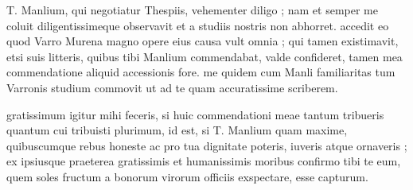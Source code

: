


 T. Manlium, qui negotiatur Thespiis, vehementer diligo ; nam et semper me coluit diligentissimeque observavit et a studiis nostris non abhorret. accedit eo quod Varro Murena magno opere eius causa vult omnia ; qui tamen existimavit, etsi suis litteris, quibus tibi Manlium commendabat, valde confideret, tamen mea commendatione aliquid accessionis fore. me quidem cum Manli familiaritas tum Varronis studium commovit ut ad te quam accuratissime scriberem.

 gratissimum igitur mihi feceris, si huic commendationi meae tantum tribueris quantum cui tribuisti plurimum, id est, si T. Manlium quam maxime, quibuscumque rebus honeste ac pro tua dignitate poteris, iuveris atque ornaveris ; ex ipsiusque praeterea gratissimis et humanissimis moribus confirmo tibi te eum, quem soles fructum a bonorum virorum officiis exspectare, esse capturum.
